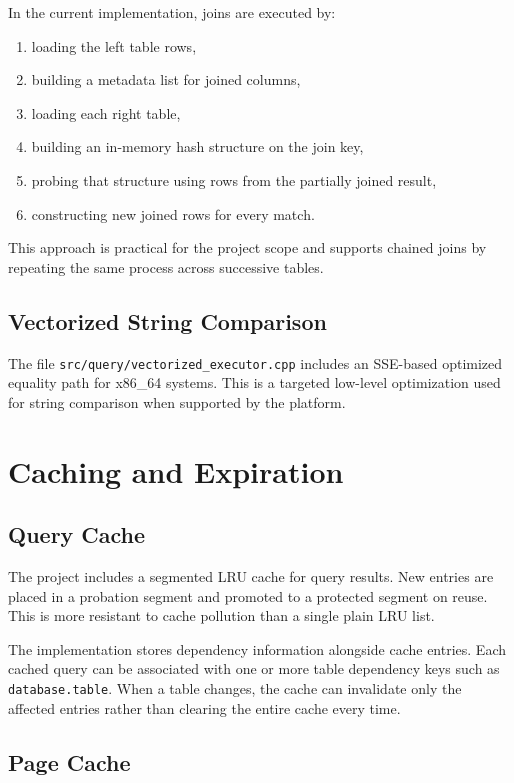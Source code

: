\documentclass[12pt,a4paper]{article}
\begin{document}
In the current implementation, joins are executed by:

\begin{enumerate}[leftmargin=1.8em]
  \item loading the left table rows,
  \item building a metadata list for joined columns,
  \item loading each right table,
  \item building an in-memory hash structure on the join key,
  \item probing that structure using rows from the partially joined result,
  \item constructing new joined rows for every match.
\end{enumerate}

This approach is practical for the project scope and supports chained joins by
repeating the same process across successive tables.

\subsection{Vectorized String Comparison}

The file \texttt{src/query/vectorized\_executor.cpp} includes an SSE-based
optimized equality path for x86\_64 systems. This is a targeted low-level
optimization used for string comparison when supported by the platform.

\section{Caching and Expiration}

\subsection{Query Cache}

The project includes a segmented LRU cache for query results. New entries are
placed in a probation segment and promoted to a protected segment on reuse.
This is more resistant to cache pollution than a single plain LRU list.

The implementation stores dependency information alongside cache entries. Each
cached query can be associated with one or more table dependency keys such as
\texttt{database.table}. When a table changes, the cache can invalidate only
the affected entries rather than clearing the entire cache every time.

\subsection{Page Cache}
\end{document}
